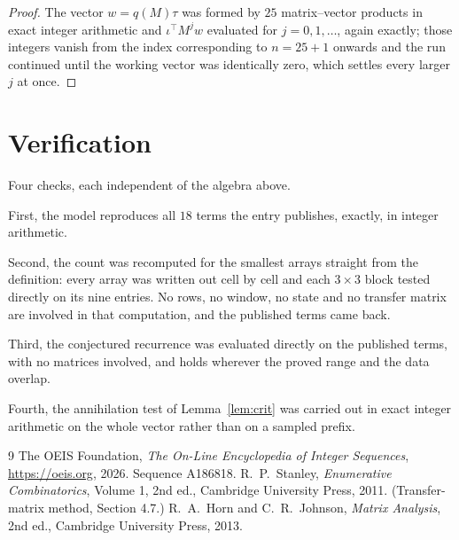 \documentclass[11pt,a4paper]{article}
\theoremstyle{plain}
\theoremstyle{definition}
\begin{document}
\begin{proof}
The vector $w=q(M)\tau$ was formed by $25$ matrix--vector products in exact integer
arithmetic and $\iota^{\!\top}M^{j}w$ evaluated for $j=0,1,\dots$, again exactly; those
integers vanish from the index corresponding to $n=25+1$ onwards and the run continued
until the working vector was identically zero, which settles every larger $j$ at once.
\end{proof}

\section{Verification}

Four checks, each independent of the algebra above.

First, the model reproduces all $18$ terms the entry publishes, exactly, in integer
arithmetic.

Second, the count was recomputed for the smallest arrays straight from the definition: every
array was written out cell by cell and each $3\times3$ block tested directly on its nine
entries. No rows, no window, no state and no transfer matrix are involved in that computation,
and the published terms came back.

Third, the conjectured recurrence was evaluated directly on the published terms, with no
matrices involved, and holds wherever the proved range and the data overlap.

Fourth, the annihilation test of Lemma~\ref{lem:crit} was carried out in exact integer
arithmetic on the whole vector rather than on a sampled prefix.

\begin{thebibliography}{9}
 The OEIS Foundation, \emph{The On-Line Encyclopedia of Integer
Sequences}, \url{https://oeis.org}, 2026. Sequence A186818.
 R.~P.~Stanley, \emph{Enumerative Combinatorics}, Volume 1, 2nd ed.,
Cambridge University Press, 2011. (Transfer-matrix method, Section 4.7.)
 R.~A.~Horn and C.~R.~Johnson, \emph{Matrix Analysis}, 2nd ed., Cambridge
University Press, 2013.
\end{thebibliography}
\end{document}

